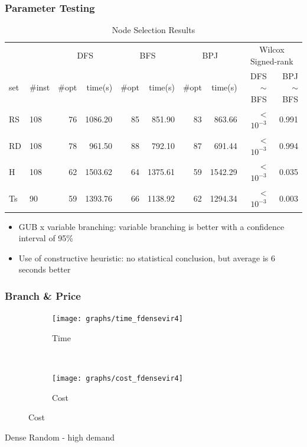 \documentclass[english]{beamer}
\begin{document}
\begin{frame}
  \frametitle{Parameter Testing}
  \begin{table}[h]
  \tiny
  \begin{center}
    \caption{Node Selection Results}\label{tab:nodesel}
  \begin{tabular} {l l | r r | r r | r r | r r }
  \hline
                  &                &  \multicolumn{2}{c|}{DFS}  & \multicolumn{2}{c|}{BFS}   & \multicolumn{2}{c|}{BPJ} & \multicolumn{2}{c}{Wilcox Signed-rank}  \\
    set           & \#inst           &  \#opt       & time(s)        & \#opt   & time(s)          & \#opt           & time(s)     & DFS $\sim$ BFS   & BPJ $\sim$ BFS  \\
   \hline 
   RS   & 108            & 76         & 1086.20    & 85        & 851.90       & 83            & 863.66   & < $10^{-3}$         & 0.991          \\
   RD   & 108            & 78         & 961.50     & 88        & 792.10       & 87            & 691.44   & < $10^{-3}$         & 0.994          \\ 
   H    & 108            & 62         & 1503.62    & 64        & 1375.61      & 59            & 1542.29  & < $10^{-3}$         & 0.035          \\
   Ts   & 90             & 59         & 1393.76    & 66        & 1138.92      & 62            & 1294.34  & < $10^{-3}$         & 0.003          \\
  \hline
  \end{tabular}
  \end{center}
  \end{table}
\begin{itemize}
  \item GUB x variable branching: variable branching is better with a confidence interval of 95\%
  \item Use of constructive heuristic: no statistical conclusion, but average is 6 seconds better
\end{itemize}
\end{frame}
\begin{frame}
  \frametitle{Branch \& Price}
  \begin{figure}
          \begin{subfigure}[b]{0.47\textwidth}
                  \texttt{[image: graphs/time\_fdensevir4]}
                  \caption{Time}
          \end{subfigure}
          ~
          \begin{subfigure}[b]{0.47\textwidth}
                  \texttt{[image: graphs/cost\_fdensevir4]}
                  \caption{Cost}
          \end{subfigure}
  \end{figure}
  Dense Random - high demand
\end{frame}
\end{document}
